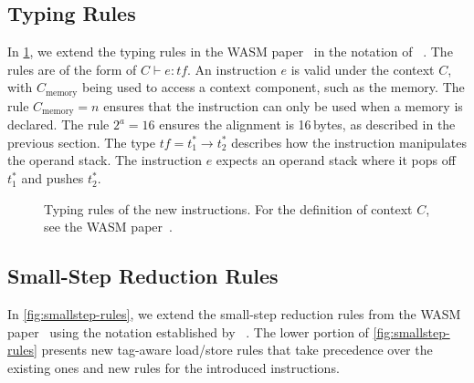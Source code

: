 \subsection{Typing Rules}
\label{subsec:typing}

In \cref{fig:typing-rules}, we extend the typing rules in the \ac{WASM} paper~\cite{haas2017bringing} in the notation of \citeauthor*{pierce2002types}~\cite{pierce2002types}.
The rules are of the form of $C \vdash e : \mathit{tf}$.
An instruction $e$ is valid under the context $C$, with $C_\text{memory}$ being used to access a context component, such as the memory.
The rule $C_\text{memory} = n$ ensures that the instruction can only be used when a memory is declared.
The rule $2^a=16$ ensures the alignment is 16\,bytes, as described in the previous section.
The type $\mathit{tf} = t_1^* \rightarrow t_2^*$ describes how the instruction manipulates the operand stack.
The instruction $e$ expects an operand stack where it pops off $t_1^*$ and pushes $t_2^*$.

\begin{figure}[t]
    \begin{prooftree}
    \end{prooftree}
    \begin{prooftree}
    \end{prooftree}
    \begin{prooftree}
    \end{prooftree}
    \caption{Typing rules of the new instructions. For the definition of context $C$, see the \ac{WASM} paper~\cite{haas2017bringing}.}
    \label{fig:typing-rules}
\end{figure}

\subsection{Small-Step Reduction Rules}
\label{subsec:small-step-reduction-rules}

In \cref{fig:smallstep-rules}, we extend the small-step reduction rules from the WASM paper~\cite{haas2017bringing} using the notation established by \citeauthor*{plotkin1981structural}~\cite{plotkin1981structural}.
The lower portion of  \cref{fig:smallstep-rules} presents new tag-aware load/store rules that take precedence over the existing ones and new rules for the introduced instructions.

